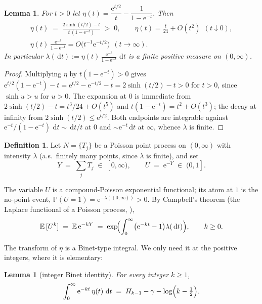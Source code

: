 \documentclass[11pt]{amsart}
\newtheorem{lemma}[theorem]{Lemma}
\theoremstyle{definition}
\newtheorem{definition}[theorem]{Definition}
\theoremstyle{remark}
\newcommand{\dd}{\,\mathrm{d}}
\newcommand{\e}{\mathrm{e}}
\newcommand{\E}{\mathbb{E}}
\newcommand{\Prob}{\mathbb{P}}
\begin{document}
\begin{lemma}\label{lem:eta}
For $t>0$ let
\(
\eta(t)=\dfrac{\e^{t/2}}{t}-\dfrac{1}{1-\e^{-t}}.
\)
Then
\begin{gather*}
\eta(t)\;=\;\frac{2\sinh(t/2)-t}{t\,(1-\e^{-t})}\;>\;0,
\qquad
\eta(t)=\frac{t}{24}+O(t^2)\ \ (t\downarrow 0),\\
\eta(t)\,\frac{\e^{-t}}{1-\e^{-t}}=O\!\bigl(t^{-1}\e^{-t/2}\bigr)\ \ (t\to\infty).
\end{gather*}
In particular
\(
\lambda(\dd t):=\eta(t)\,\frac{\e^{-t}}{1-\e^{-t}}\,\dd t
\)
is a finite positive measure on $(0,\infty)$.
\end{lemma}

\begin{proof}
Multiplying $\eta$ by $t(1-\e^{-t})>0$ gives
$\e^{t/2}(1-\e^{-t})-t=\e^{t/2}-\e^{-t/2}-t=2\sinh(t/2)-t>0$ for
$t>0$, since $\sinh u>u$ for $u>0$. The expansion at $0$ is immediate
from $2\sinh(t/2)-t=t^3/24+O(t^5)$ and $t(1-\e^{-t})=t^2+O(t^3)$; the
decay at infinity from $2\sinh(t/2)\le \e^{t/2}$. Both endpoints are
integrable against $\e^{-t}/(1-\e^{-t})\,\dd t \sim \dd t/t$ at $0$ and
$\sim\e^{-t}\dd t$ at $\infty$, whence $\lambda$ is finite.
\end{proof}

\begin{definition}\label{def:U}
Let $N=\{T_j\}$ be a Poisson point process on $(0,\infty)$ with
intensity $\lambda$ (a.s.\ finitely many points, since
$\lambda$ is finite), and set
\[
Y\;=\;\sum_j T_j\;\in\;[0,\infty),
\qquad
U\;=\;\e^{-Y}\;\in\;(0,1] .
\]
\end{definition}

The variable $U$ is a compound-Poisson exponential functional; its
atom at $1$ is the no-point event,
$\Prob(U=1)=\e^{-\lambda((0,\infty))}>0$. By Campbell's theorem
(the Laplace functional of a Poisson process,
\cite[Sec.~3.2]{kingman}),
\begin{equation}\label{eq:CP}
\E\,[U^k]\;=\;\E\,\e^{-kY}
\;=\;\exp\!\Bigl(\int_0^\infty\bigl(\e^{-kt}-1\bigr)\lambda(\dd t)\Bigr),
\qquad k\ge 0 .
\end{equation}

The transform of $\eta$ is a Binet-type integral. We only need it at
the positive integers, where it is elementary:

\begin{lemma}[integer Binet identity]\label{lem:binet}
For every integer $k\ge 1$,
\[
\int_0^\infty \e^{-kt}\,\eta(t)\,\dd t
\;=\;H_{k-1}-\gamma-\log\Bigl(k-\tfrac12\Bigr).
\]
\end{lemma}
\end{document}
